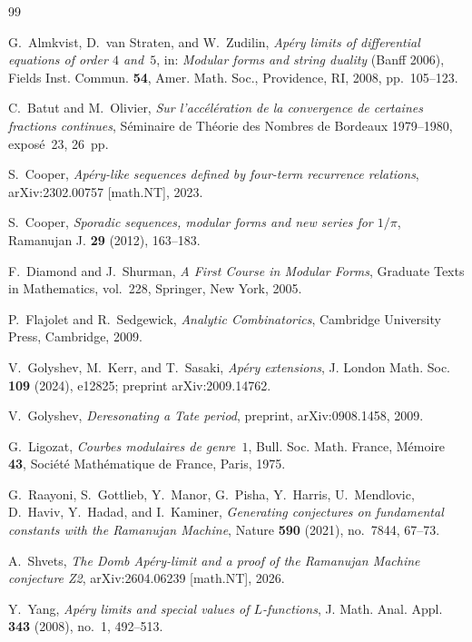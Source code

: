 \documentclass[11pt]{amsart}
\numberwithin{equation}{section}
\theoremstyle{plain}
\theoremstyle{definition}
\theoremstyle{remark}
\begin{document}
\begin{thebibliography}{99}

G.~Almkvist, D.~van Straten, and W.~Zudilin,
\emph{Apéry limits of differential equations of order $4$ and~$5$},
in: \emph{Modular forms and string duality} (Banff 2006),
Fields Inst. Commun. \textbf{54}, Amer. Math. Soc., Providence, RI, 2008,
pp.~105--123.

C.~Batut and M.~Olivier,
\emph{Sur l'accélération de la convergence de certaines fractions continues},
Séminaire de Théorie des Nombres de Bordeaux 1979--1980, exposé~23, 26~pp.

S.~Cooper,
\emph{Apéry-like sequences defined by four-term recurrence relations},
arXiv:2302.00757 [math.NT], 2023.

S.~Cooper,
\emph{Sporadic sequences, modular forms and new series for $1/\pi$},
Ramanujan J. \textbf{29} (2012), 163--183.

F.~Diamond and J.~Shurman,
\emph{A First Course in Modular Forms},
Graduate Texts in Mathematics, vol.~228, Springer, New York, 2005.

P.~Flajolet and R.~Sedgewick,
\emph{Analytic Combinatorics},
Cambridge University Press, Cambridge, 2009.

V.~Golyshev, M.~Kerr, and T.~Sasaki,
\emph{Apéry extensions},
J. London Math. Soc. \textbf{109} (2024), e12825; preprint arXiv:2009.14762.

V.~Golyshev,
\emph{Deresonating a Tate period},
preprint, arXiv:0908.1458, 2009.

G.~Ligozat,
\emph{Courbes modulaires de genre~$1$},
Bull. Soc. Math. France, Mémoire \textbf{43}, Société Mathématique de France,
Paris, 1975.


G.~Raayoni, S.~Gottlieb, Y.~Manor, G.~Pisha, Y.~Harris, U.~Mendlovic,
D.~Haviv, Y.~Hadad, and I.~Kaminer,
\emph{Generating conjectures on fundamental constants with the Ramanujan Machine},
Nature \textbf{590} (2021), no.~7844, 67--73.

A.~Shvets,
\emph{The Domb Apéry-limit and a proof of the Ramanujan Machine conjecture Z2},
arXiv:2604.06239 [math.NT], 2026.

Y.~Yang,
\emph{Apéry limits and special values of $L$-functions},
J. Math. Anal. Appl. \textbf{343} (2008), no.~1, 492--513.

\end{thebibliography}
\end{document}
